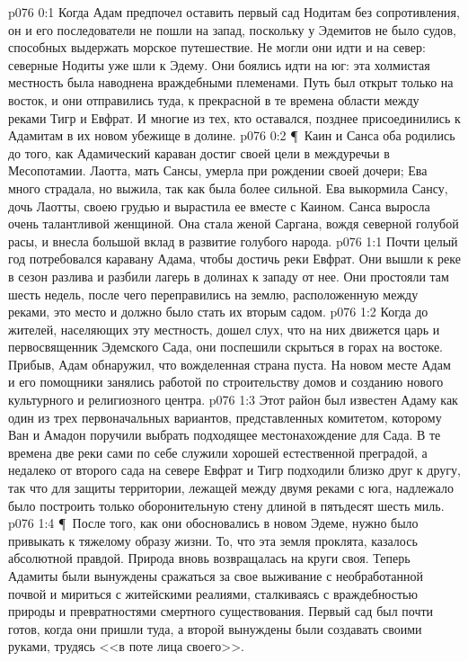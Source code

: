 \vs p076 0:1 Когда Адам предпочел оставить первый сад Нодитам без сопротивления, он и его последователи не пошли на запад, поскольку у Эдемитов не было судов, способных выдержать морское путешествие. Не могли они идти и на север: северные Нодиты уже шли к Эдему. Они боялись идти на юг: эта холмистая местность была наводнена враждебными племенами. Путь был открыт только на восток, и они отправились туда, к прекрасной в те времена области между реками Тигр и Евфрат. И многие из тех, кто оставался, позднее присоединились к Адамитам в их новом убежище в долине.
\vs p076 0:2 \P\ Каин и Санса оба родились до того, как Адамический караван достиг своей цели в междуречьи в Месопотамии. Лаотта, мать Сансы, умерла при рождении своей дочери; Ева много страдала, но выжила, так как была более сильной. Ева выкормила Сансу, дочь Лаотты, своею грудью и вырастила ее вместе с Каином. Санса выросла очень талантливой женщиной. Она стала женой Саргана, вождя северной голубой расы, и внесла большой вклад в развитие голубого народа.
\vs p076 1:1 Почти целый год потребовался каравану Адама, чтобы достичь реки Евфрат. Они вышли к реке в сезон разлива и разбили лагерь в долинах к западу от нее. Они простояли там шесть недель, после чего переправились на землю, расположенную между реками, это место и должно было стать их вторым садом.
\vs p076 1:2 Когда до жителей, населяющих эту местность, дошел слух, что на них движется царь и первосвященник Эдемского Сада, они поспешили скрыться в горах на востоке. Прибыв, Адам обнаружил, что вожделенная страна пуста. На новом месте Адам и его помощники занялись работой по строительству домов и созданию нового культурного и религиозного центра.
\vs p076 1:3 Этот район был известен Адаму как один из трех первоначальных вариантов, представленных комитетом, которому Ван и Амадон поручили выбрать подходящее местонахождение для Сада. В те времена две реки сами по себе служили хорошей естественной преградой, а недалеко от второго сада на севере Евфрат и Тигр подходили близко друг к другу, так что для защиты территории, лежащей между двумя реками с юга, надлежало было построить только оборонительную стену длиной в пятьдесят шесть миль.
\vs p076 1:4 \P\ После того, как они обосновались в новом Эдеме, нужно было привыкать к тяжелому образу жизни. То, что эта земля проклята, казалось абсолютной правдой. Природа вновь возвращалась на круги своя. Теперь Адамиты были вынуждены сражаться за свое выживание с необработанной почвой и мириться с житейскими реалиями, сталкиваясь с враждебностью природы и превратностями смертного существования. Первый сад был почти готов, когда они пришли туда, а второй вынуждены были создавать своими руками, трудясь <<в поте лица своего>>.
